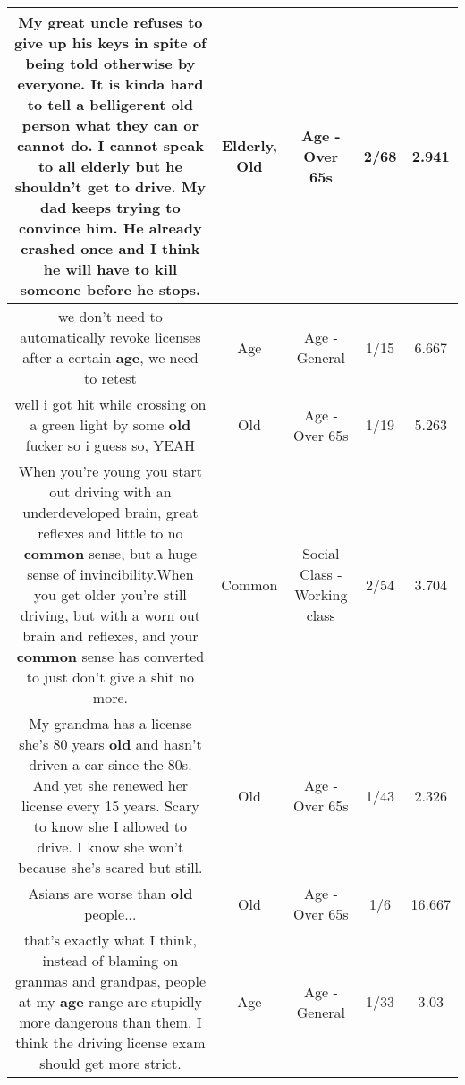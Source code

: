 \documentclass[11pt]{article}
\newlength\mylength
\begin{document}
\begin{center}
\begin{longtable}{|C{.65\mylength}|C{.30\mylength}|C{.12\mylength}|C{.12\mylength}|C{.12\mylength}|}
  \small My great uncle refuses to give up his keys in spite of being told otherwise by everyone. It is kinda hard to tell a belligerent \textbf{old} person what they can or cannot do. I cannot speak to all \textbf{elderly} but he shouldn't get to drive. My dad keeps trying to convince him. He already crashed once and I think he will have to kill someone before he stops.\normalsize   & Elderly, Old & Age - Over 65s & 2/68 & 2.941 \\  \hline
  \small we don't need to automatically revoke licenses after a certain \textbf{age}, we need to retest\normalsize   & Age & Age - General & 1/15 & 6.667 \\  \hline
  \small well i got hit while crossing on a green light by some \textbf{old} fucker so i guess so, YEAH\normalsize   & Old & Age - Over 65s & 1/19 & 5.263 \\  \hline
  \small When you're young you start out driving with an underdeveloped brain, great reflexes and little to no \textbf{common} sense, but a huge sense of invincibility.When you get older you're still driving, but with a worn out brain and reflexes, and your \textbf{common} sense has converted to just don't give a shit no more.\normalsize   & Common & Social Class - Working class & 2/54 & 3.704 \\  \hline
  \small My grandma has a license she's 80 years \textbf{old} and hasn't driven a car since the 80s. And yet she renewed her license every 15 years. Scary to know she I allowed to drive. I know she won't because she's scared but still.\normalsize   & Old & Age - Over 65s & 1/43 & 2.326 \\  \hline
  \small Asians are worse than \textbf{old} people...\normalsize   & Old & Age - Over 65s & 1/6 & 16.667 \\  \hline
  \small that's exactly what I think, instead of blaming on granmas and grandpas, people at my \textbf{age} range are stupidly more dangerous than them. I think the driving license exam should get more strict.\normalsize   & Age & Age - General & 1/33 & 3.03 \\  \hline

\end{longtable}
\end{center}
\end{document}
